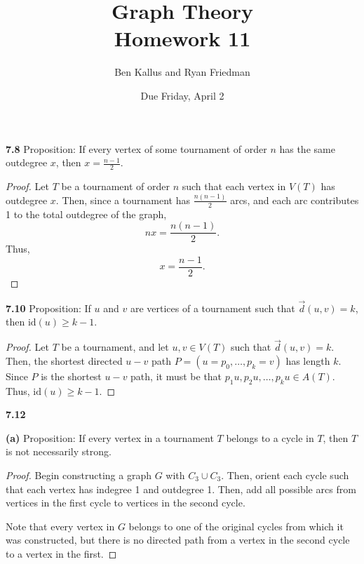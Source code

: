 \documentclass[12pt]{article}
\title{Graph Theory \\ Homework 11}
\author{Ben Kallus and Ryan Friedman}
\date{Due Friday, April 2}
\newcommand{\id}{\text{id}}
\begin{document}
\maketitle

\noindent\textbf{7.8} Proposition: If every vertex of some tournament of order $n$ has the same outdegree $x$, then $x = \frac{n-1}2$.
\begin{proof}
	Let $T$ be a tournament of order $n$ such that each vertex in $V(T)$ has outdegree $x$.
	Then, since a tournament has $\frac{n(n-1)}2$ arcs, and each arc contributes 1 to the total outdegree of the graph, $$nx = \frac{n(n-1)}2.$$
	Thus, $$x = \frac{n-1}2.$$
\end{proof}

\newpage\noindent\textbf{7.10} Proposition: If $u$ and $v$ are vertices of a tournament such that $\vec{d}(u,v) = k$, then $\id(u) \geq k - 1$.
\begin{proof}
	Let $T$ be a tournament, and let $u,v \in V(T)$ such that $\vec d(u,v) = k$.
	Then, the shortest directed $u-v$ path $P = (u = p_0, \hdots, p_k = v)$ has length $k$.
	Since $P$ is the shortest $u-v$ path, it must be that $p_1u, p_2u, \hdots, p_ku \in A(T)$.
	Thus, $\id(u) \geq k-1$.
\end{proof}
	

\newpage\noindent\textbf{7.12}

\textbf{(a)} Proposition: If every vertex in a tournament $T$ belongs to a cycle in $T$, then $T$ is not necessarily strong.
\begin{proof}
	Begin constructing a graph $G$ with $C_3 \cup C_3$.
	Then, orient each cycle such that each vertex has indegree 1 and outdegree 1.
	Then, add all possible arcs from vertices in the first cycle to vertices in the second cycle.

	Note that every vertex in $G$ belongs to one of the original cycles from which it was constructed, but there is no directed path from a vertex in the second cycle to a vertex in the first.
\end{proof}
\end{document}
